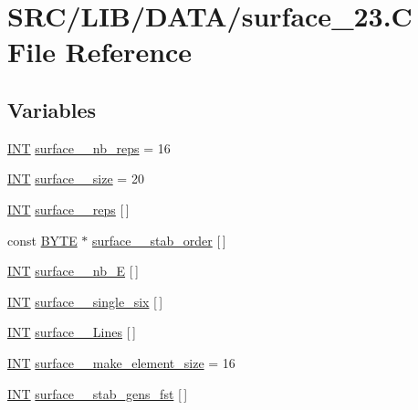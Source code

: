 \hypertarget{surface__23_8_c}{}\section{S\+R\+C/\+L\+I\+B/\+D\+A\+T\+A/surface\+\_\+23.C File Reference}
\label{surface__23_8_c}
\subsection*{Variables}
\begin{DoxyCompactItemize}
\item 
\mbox{\hyperlink{galois_8h_a09fddde158a3a20bd2dcadb609de11dc}{I\+NT}} \mbox{\hyperlink{surface__23_8_c_ae54c90d8f270aeac177f2ed5eef5996e}{surface\+\_\+\_\+nb\+\_\+reps}} = 16
\item 
\mbox{\hyperlink{galois_8h_a09fddde158a3a20bd2dcadb609de11dc}{I\+NT}} \mbox{\hyperlink{surface__23_8_c_acbcd3c9b8b7b8ef99f2d7d9d94236f54}{surface\+\_\+\_\+size}} = 20
\item 
\mbox{\hyperlink{galois_8h_a09fddde158a3a20bd2dcadb609de11dc}{I\+NT}} \mbox{\hyperlink{surface__23_8_c_aa6f70166b6aba7b9ee5528e74b376ae5}{surface\+\_\+\_\+reps}} \mbox{[}$\,$\mbox{]}
\item 
const \mbox{\hyperlink{galois_8h_ab6cc7b4aeb6ea31aba2b3fbfc83ff5e6}{B\+Y\+TE}} $\ast$ \mbox{\hyperlink{surface__23_8_c_a1679d74959335b9aa2089fe3d427a3ba}{surface\+\_\+\_\+stab\+\_\+order}} \mbox{[}$\,$\mbox{]}
\item 
\mbox{\hyperlink{galois_8h_a09fddde158a3a20bd2dcadb609de11dc}{I\+NT}} \mbox{\hyperlink{surface__23_8_c_a2300d20a8ef5d9d2fc394d049bb0ed0a}{surface\+\_\+\_\+nb\+\_\+E}} \mbox{[}$\,$\mbox{]}
\item 
\mbox{\hyperlink{galois_8h_a09fddde158a3a20bd2dcadb609de11dc}{I\+NT}} \mbox{\hyperlink{surface__23_8_c_abfe25c60f050c5cddead25b28481c0fd}{surface\+\_\+\_\+single\+\_\+six}} \mbox{[}$\,$\mbox{]}
\item 
\mbox{\hyperlink{galois_8h_a09fddde158a3a20bd2dcadb609de11dc}{I\+NT}} \mbox{\hyperlink{surface__23_8_c_abc7115cf683c1f76bd5837e922f47a2f}{surface\+\_\+\_\+\+Lines}} \mbox{[}$\,$\mbox{]}
\item 
\mbox{\hyperlink{galois_8h_a09fddde158a3a20bd2dcadb609de11dc}{I\+NT}} \mbox{\hyperlink{surface__23_8_c_ac95d69ae64b5116ad455116a6e093386}{surface\+\_\+\_\+make\+\_\+element\+\_\+size}} = 16
\item 
\mbox{\hyperlink{galois_8h_a09fddde158a3a20bd2dcadb609de11dc}{I\+NT}} \mbox{\hyperlink{surface__23_8_c_a2b241e67276b4e521f4ad0196d6a0ba1}{surface\+\_\+\_\+stab\+\_\+gens\+\_\+fst}} \mbox{[}$\,$\mbox{]}

\end{DoxyCompactItemize}
